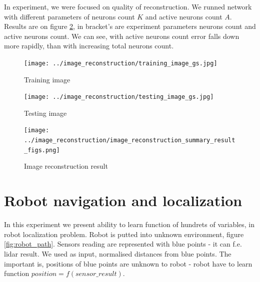 \documentclass[10pt,a4paper]{article}
\begin{document}
In experiment, we were focused on quality of reconstruction. We runned network
with different parameters of neurons count $K$ and active neurons count $A$.
Results are on figure \ref{fig:image_reconstruction}, in bracket's are experiment
parameters neurons count and active neurons count. We can see, with active neurons count
error falls down more rapidly, than with increasing total neurons count.

\begin{figure}[ht]
\centering
\begin{minipage}[b]{.4\textwidth}

  \centering
  \texttt{[image: ../image\_reconstruction/training\_image\_gs.jpg]}
  \caption{Training image}
  \label{fig:training_image}

\end{minipage}\qquad
\begin{minipage}[b]{.4\textwidth}

  \centering
  \texttt{[image: ../image\_reconstruction/testing\_image\_gs.jpg]}
  \caption{Testing image}
  \label{fig:testing_image}



\end{minipage}
\end{figure}


\begin{figure}[ht]
  \centering
  \texttt{[image: ../image\_reconstruction/image\_reconstruction\_summary\_result\_figs.png]}
  \caption{Image reconstruction result}
  \label{fig:image_reconstruction}
\end{figure}















\newpage
\section{Robot navigation and localization}
In this experiment we present ability to learn function of hundrets of variables,
in robot localization problem.
Robot is putted into unknown environment, figure \ref{fig:robot_path}. Sensors reading
are represented with blue points - it can f.e. lidar result. We used as input,
normalised distances from blue points. The important is, positions of blue points
are unknown to robot - robot have to learn function $position = f(sensor\_result)$.
\end{document}
